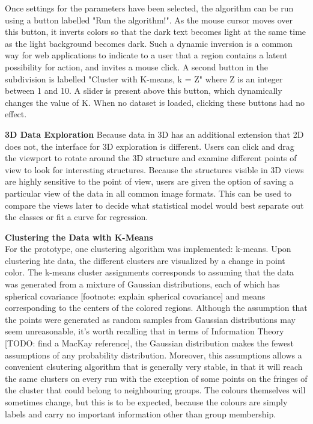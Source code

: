 \documentclass{sigchi}
\begin{document}
Once settings for the parameters have been selected, the algorithm can be run using a button labelled "Run the algorithm!". As the mouse cursor moves over this button, it inverts colors so that the dark text becomes light at the same time as the light background becomes dark. Such a dynamic inversion is a common way for web applications to indicate to a user that a region contains a latent possibility for action, and invites a mouse click. A second button in the subdivision is labelled "Cluster with K-means, k = Z" where Z is an integer between 1 and 10. A slider is present above this button, which dynamically changes the value of K. When no dataset is loaded, clicking these buttons had no effect.

\textbf{3D Data Exploration}
Because data in 3D has an additional extension that 2D does not, the interface for 3D exploration is different. Users can click and drag the viewport to rotate around the 3D structure and examine different points of view to look for interesting structures. Because the structures visible in 3D views are highly sensitive to the point of view, users are given the option of saving a particular view of the data in all common image formats. This can be used to compare the views later to decide what statistical model would best separate out the classes or fit a curve for regression.

\textbf{Clustering the Data with K-Means}\\
For the prototype, one clustering algorithm was implemented: k-means. Upon clustering hte data, the different clusters are visualized by a change in point color. The k-means cluster assignments corresponds to assuming that the data was generated from a mixture of Gaussian distributions, each of which has spherical covariance [footnote: explain spherical covariance] and means corresponding to the centers of the colored regions. Although the assumption that the points were generated as random samples from Gaussian distributions may seem unreasonable, it's worth recalling that in terms of Information Theory [TODO: find a MacKay reference], the Gaussian distribution makes the fewest  assumptions of any probability distribution. Moreover, this assumptions allows a convenient clsutering algorithm that is generally very stable, in that it will reach the same clusters on every run with the exception of some points on the fringes of the cluster that could belong to neighbouring groups. The colours themselves will sometimes change, but this is to be expected, because the colours are simply labels and carry no important information other than group membership.
\end{document}
